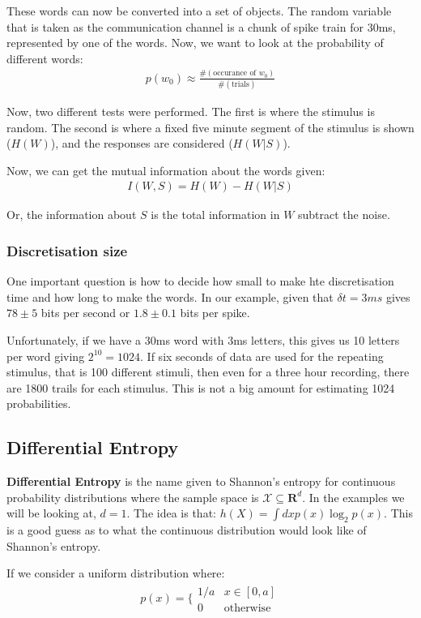 \documentclass[11pt,a4paper,titlepage,dvipsnames,cmyk]{scrartcl}
\begin{document}
These words can now be converted into a set of objects. The random variable that is taken as the communication channel is a chunk of spike train for 30ms, represented by one of the words. Now, we want to look at the probability of different words:
\begin{align*}
p(w_0) \approx \frac{\#(\text{occurance of } w_0)}{\# (\text{trials})}
\end{align*}

Now, two different tests were performed. The first is where the stimulus is random. The second is where a fixed five minute segment of the stimulus is shown ($H(W)$), and the responses are considered ($H(W|S)$). 

Now, we can get the mutual information about the words given:
\begin{align*}
I(W,S) = H(W) - H(W|S)
\end{align*}

Or, the information about $S$ is the total information in $W$ subtract the noise.

\subsubsection{Discretisation size}
One important question is how to decide how small to make hte discretisation time and how long to make the words. In our example, given that $\delta t = 3ms$ gives $78 \pm 5$ bits per second or $1.8 \pm 0.1$ bits per spike.

Unfortunately, if we have a 30ms word with 3ms letters, this gives us 10 letters per word giving $2^{10} = 1024$. If six seconds of data are used for the repeating stimulus, that is 100 different stimuli, then even for a three hour recording, there are 1800 trails for each stimulus. This is not a big amount for estimating 1024 probabilities.

\subsection{Differential Entropy}
\textbf{Differential Entropy} is the name given to Shannon's entropy for continuous probability distributions where the sample space is $\mathcal{X} \subseteq \mathbf{R}^d$. In the examples we will be looking at, $d = 1$. The idea is that: $h(X) = \int dxp(x) \log_2 p(x)$. This is a good guess as to what the continuous distribution would look like of Shannon's entropy.

If we consider a uniform distribution where:
\begin{align*}
p(x) = \bigg \{ \begin{matrix}
    1/a & x \in [0,a] \\
    0 & \text{otherwise}
\end{matrix}
\end{align*}
\end{document}
